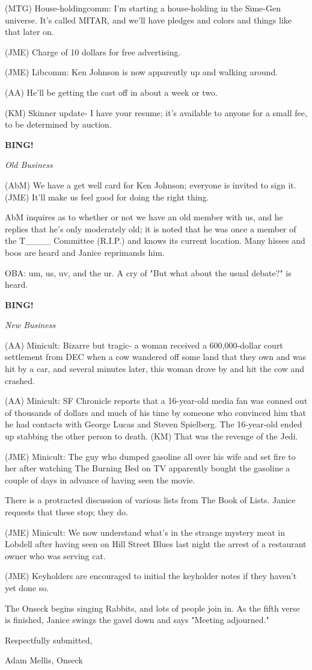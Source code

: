 \documentclass[12pt]{article}
\newcommand{\bing}{{\bf BING!} }
\newcommand{\goto}[1]{\bing \vskip 12pt \centerline{{\em{#1}}}}
\begin{document}
(MTG) House-holdingcomm: I'm starting a house-holding in the Sime-Gen universe. It's called MITAR, and we'll have pledges and colors and things like that later on.

(JME) Charge of 10 dollars for free advertising.

(JME) Libcomm: Ken Johnson is now apparently up and walking around.

(AA) He'll be getting the cast off in about a week or two.

(KM) Skinner update- I have your resume; it's available to anyone for a small fee, to be determined by auction.

\goto{Old Business}

(AbM) We have a get well card for Ken Johnson; everyone is invited to sign it. (JME) It'll make us feel good for doing the right thing.

AbM inquires as to whether or not we have an old member with us, and he replies that he's only moderately old; it is noted that he was once a member of the T____ Committee (R.I.P.) and knows its current location. Many hisses and boos are heard and Janice reprimands him.

OBA: um, us, uv, and the ur. A cry of "But what about the usual debate?" is heard.

\goto{New Business}

(AA) Minicult: Bizarre but tragic- a woman received a 600,000-dollar court settlement from DEC when a cow wandered off some land that they own and was hit by a car, and several minutes later, this woman drove by and hit the cow and crashed.

(AA) Minicult: SF Chronicle reports that a 16-year-old media fan was conned out of thousands of dollars and much of his time by someone who convinced him that he had contacts with George Lucas and Steven Spielberg. The 16-year-old ended up stabbing the other person to death. (KM) That was the revenge of the Jedi.

(JME) Minicult: The guy who dumped gasoline all over his wife and set fire to her after watching The Burning Bed on TV apparently bought the gasoline a couple of days in advance of having seen the movie.

There is a protracted discussion of various lists from The Book of Lists. Janice requests that these stop; they do.

(JME) Minicult: We now understand what's in the strange mystery meat in Lobdell after having seen on Hill Street Blues last night the arrest of a restaurant owner who was serving cat.

(JME) Keyholders are encouraged to initial the keyholder notes if they haven't yet done so.

The Onseck begins singing Rabbits, and lots of people join in. As the fifth verse is finished, Janice swings the gavel down and says "Meeting adjourned."

\vspace{18pt}

\centerline{Respectfully submitted,}
\centerline{Adam Mellis, Onseck}
\end{document}
